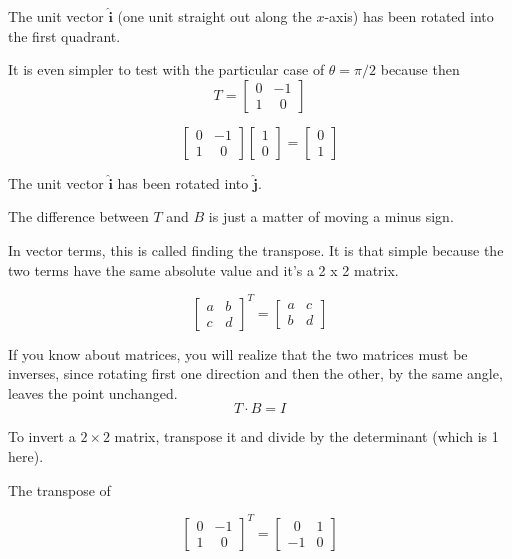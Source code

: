\documentclass[11pt, oneside]{article}
\begin{document}
The unit vector $\mathbf{\hat{i}}$ (one unit straight out along the $x$-axis) has been rotated into the first quadrant.

It is even simpler to test with the particular case of $\theta = \pi/2$ because then
\[ 
T=
\begin{bmatrix}  
0 & -1 \\
1 & \ \ 0
\end{bmatrix}
\]

\[
\begin{bmatrix}  
0 & -1 \\
1 & \ \ 0
\end{bmatrix}
\begin{bmatrix}
1 \\
0
\end{bmatrix}
=
\begin{bmatrix}  
0 \\
1
\end{bmatrix}
\]

The unit vector $\mathbf{\hat{i}}$ has been rotated into $\mathbf{\hat{j}}$.

The difference between $T$ and $B$ is just a matter of moving a minus sign.  

In vector terms, this is called finding the transpose.  It is that simple because the two terms have the same absolute value and it's a 2 x 2 matrix.

\[
\begin{bmatrix}  
a & b \\
c & d
\end{bmatrix}^T
=
\begin{bmatrix}  
a & c \\
b & d
\end{bmatrix}
\]

If you know about matrices, you will realize that the two matrices must be inverses, since rotating first one direction and then the other, by the same angle, leaves the point unchanged.
\[ T \cdot  B= I \]

To invert a $2 \times 2$ matrix, transpose it and divide by the determinant (which is 1 here).

The transpose of 

\[
\begin{bmatrix}  
0 & -1 \\
1 & \ \ 0
\end{bmatrix}^T
=
\begin{bmatrix}  
\ \ 0 & 1 \\
-1 & 0
\end{bmatrix}
\]
\end{document}
